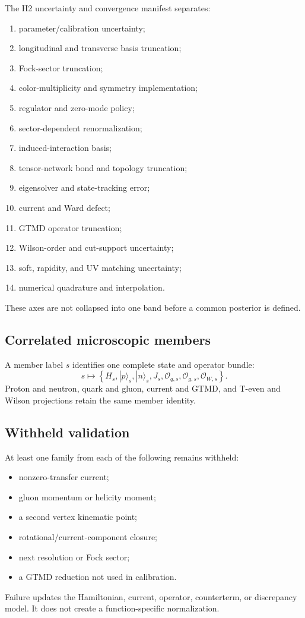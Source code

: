 \documentclass[11pt]{article}
\newcommand{\cO}{\mathcal O}
\begin{document}
The H2 uncertainty and convergence manifest separates:
\begin{enumerate}
 \item parameter/calibration uncertainty;
 \item longitudinal and transverse basis truncation;
 \item Fock-sector truncation;
 \item color-multiplicity and symmetry implementation;
 \item regulator and zero-mode policy;
 \item sector-dependent renormalization;
 \item induced-interaction basis;
 \item tensor-network bond and topology truncation;
 \item eigensolver and state-tracking error;
 \item current and Ward defect;
 \item GTMD operator truncation;
 \item Wilson-order and cut-support uncertainty;
 \item soft, rapidity, and UV matching uncertainty;
 \item numerical quadrature and interpolation.
\end{enumerate}
These axes are not collapsed into one band before a common posterior is
defined.

\subsection{Correlated microscopic members}

A member label \(s\) identifies one complete state and operator bundle:
\begin{equation}
 s
 \mapsto
 \left
 \{
 H_s,
 |p\rangle_s,
 |n\rangle_s,
 J_s,
 \cO_{q,s},
 \cO_{g,s},
 \cO_{W,s}
 \right\}.
\end{equation}
Proton and neutron, quark and gluon, current and GTMD, and T-even and Wilson
projections retain the same member identity.

\subsection{Withheld validation}

At least one family from each of the following remains withheld:
\begin{itemize}
 \item nonzero-transfer current;
 \item gluon momentum or helicity moment;
 \item a second vertex kinematic point;
 \item rotational/current-component closure;
 \item next resolution or Fock sector;
 \item a GTMD reduction not used in calibration.
\end{itemize}
Failure updates the Hamiltonian, current, operator, counterterm, or discrepancy
model.  It does not create a function-specific normalization.
\end{document}
